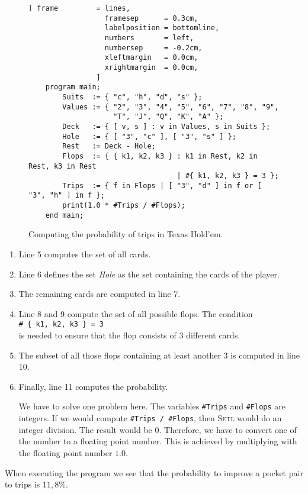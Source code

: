 \begin{figure}[!ht]
\centering
\begin{Verbatim}[ frame         = lines, 
                  framesep      = 0.3cm, 
                  labelposition = bottomline,
                  numbers       = left,
                  numbersep     = -0.2cm,
                  xleftmargin   = 0.0cm,
                  xrightmargin  = 0.0cm,
                ]
    program main;
        Suits  := { "c", "h", "d", "s" };
        Values := { "2", "3", "4", "5", "6", "7", "8", "9", 
                    "T", "J", "Q", "K", "A" }; 
        Deck   := { [ v, s ] : v in Values, s in Suits };
        Hole   := { [ "3", "c" ], [ "3", "s" ] };
        Rest   := Deck - Hole;
        Flops  := { { k1, k2, k3 } : k1 in Rest, k2 in Rest, k3 in Rest 
                                   | #{ k1, k2, k3 } = 3 };
        Trips  := { f in Flops | [ "3", "d" ] in f or [ "3", "h" ] in f };
        print(1.0 * #Trips / #Flops);
    end main;
\end{Verbatim}
\vspace*{-0.3cm}
\caption{Computing the probability of trips in Texas Hold'em.}
\label{fig:poker-tripple.stl}
\end{figure}

\begin{enumerate}
\item Line 5 computes the set of all cards.
\item Line 6 defines the set \textsl{Hole} as the set containing the cards of the player.
\item The remaining cards are computed in line 7.
\item Line 8 and 9 compute the set of all possible flops.
      The condition
      \\[0.2cm]
      \hspace*{1.3cm}
      \texttt{\# \{ k1, k2, k3 \} = 3 }
      \\[0.2cm]
      is needed to ensure that the flop consists of 3 different cards.
\item The subset of all those flops containing at least another 3 is computed in line 10.
\item Finally, line 11 computes the probability.

      We have to solve one problem here.  The variables
      \texttt{\#Trips} and \texttt{\#Flops} are integers.  If we would compute
      \texttt{\#Trips / \#Flops}, then \textsc{Setl} would do an integer division.
      The result would be 0.  Therefore, we have to convert one of the number to a
      floating point number.  This is achieved by multiplying with the floating point number $1.0$.
\end{enumerate}
When executing the program we see that the probability to improve a pocket pair
to trips is $11,8\%$.
\vspace*{0.1cm}

